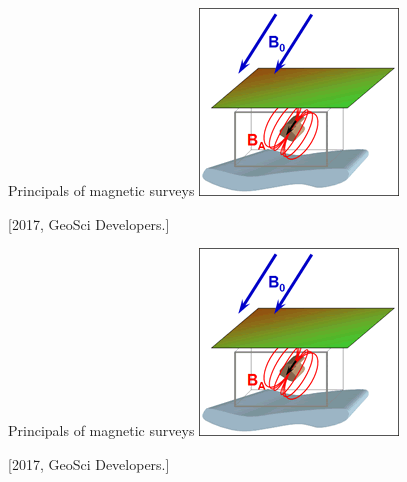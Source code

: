 \begin{frame}
  \begin{PointSix}{Principals of magnetic surveys}
    \includegraphics[width=0.80\linewidth]{Figures/Magnetics/inducing_field.png}

  \tiny [2017, GeoSci Developers.]
  \end{PointSix}
\end{frame}

\begin{frame}
  \begin{PointSix}{Principals of magnetic surveys}
    \includegraphics[width=0.80\linewidth]{Figures/Magnetics/inducing_field.png}

  \tiny [2017, GeoSci Developers.]
  \end{PointSix}
\end{frame}

